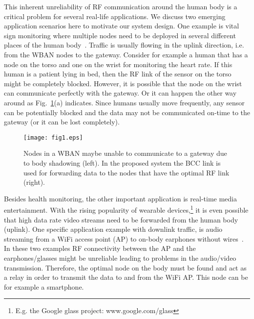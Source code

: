 \documentclass[10pt]{IEEEtran}
\begin{document}
This inherent unreliability of RF communication around the human body is a critical problem for several real-life applications. We discuss two emerging application scenarios here to motivate our system design. One example is vital sign monitoring where multiple nodes need to be deployed in several different places of the human body~\cite{Yuce2010116}. Traffic is usually flowing in the uplink direction, i.e. from the WBAN nodes to the gateway. Consider for example a human that has a node on the torso and one on the wrist for monitoring the heart rate. If this human is a patient lying in bed, then the RF link of the sensor on the torso might be completely blocked. However, it is possible that the node on the wrist can communicate perfectly with the gateway. Or it can happen the other way around as Fig.~\ref{fig:dual-rf-bcc-principle}(a) indicates. Since humans usually move frequently, any sensor can be potentially blocked and the data may not be communicated on-time to the gateway (or it can be lost completely).
\begin{figure}[t]
\begin{center}
\texttt{[image: fig1.eps]}
  \caption{Nodes in a WBAN maybe unable to communicate to a gateway due to body shadowing (left). In the proposed system the BCC link is used for forwarding data to the nodes that have the optimal RF link (right).}
  \label{fig:dual-rf-bcc-principle}
\end{center}
\end{figure}
Besides health monitoring, the other important application is real-time media entertainment. With the rising popularity of wearable devices,\footnote{E.g. the Google glass project: www.google.com/glass} it is even possible that high data rate video streams need to be forwarded from the human body (uplink). One specific application example with downlink traffic, is audio streaming from a WiFi access point (AP) to on-body earphones without wires~\cite{baldus2010method}. In these two examples RF connectivity between the AP and the earphones/glasses might be unreliable leading to problems in the audio/video transmission. Therefore, the optimal node on the body must be found and act as a relay in order to transmit the data to and from the WiFi AP. This node can be for example a smartphone.
\end{document}
